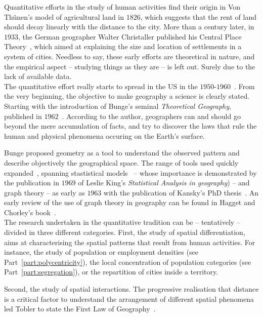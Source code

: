 Quantitative efforts in the study of human activities find their origin in Von
Th\"unen's model of agricultural land in $1826$, which suggests that the rent of land
should decay linearly with the distance to the city. More than a century later,
in $1933$, the German geographer Walter Christaller published his Central Place
Theory~\cite{Christaller:1933}, which aimed at explaining the size and location
of settlements in a system of cities. Needless to say, these early efforts are
theoretical in nature, and the empirical aspect -- studying things as they are
-- is left out. Surely due to the lack of available data.\\

The quantitative effort really starts to spread in the US in the
$1950$-$1960$~\cite{Berry:1993}. From the very beginning, the objective to make
geography a science is clearly stated. Starting with the introduction of Bunge's
seminal \emph{Theoretical Geography}, published in $1962$~\cite{Bunge:1962}.
According to the author, geographers can and should go beyond the mere
accumulation of facts, and try to discover the laws that rule the human and
physical phenomena occuring on the Earth's surface.   

Bunge proposed geometry as a tool to understand the observed pattern and
describe objectively the geographical space. The range of tools used quickly
expanded~\cite{Haggett:1966,Chorley:1968}, spanning stastistical
models~\cite{King:1969, Brunsdon:1998} -- whose importance is demonstrated by
the publication in $1969$ of Leslie King's \emph{Statistical Analysis in
geography}) -- and graph theory  -- as early as $1963$ with the publication of
Kansky's PhD thesis~\cite{Kansky:1963}. An early review of the use of graph
theory in geography can be found in Hagget and Chorley's
book~\cite{Haggett:1969}.\\

The research undertaken in the quantitative tradition can be -- tentatively --
divided in three different categories. First, the study of spatial
differentiation, aims at characterising the spatial patterns that result from
human activities. For instance, the study of population or employment densities
(see Part~\ref{part:polycentricity}), the local concentration of population
categories (see Part~\ref{part:segregation}), or the repartition of cities
inside a territory. 

Second, the study of spatial interactions. The progressive realisation that
distance is a critical factor to understand the arrangement of different spatial
phenomena led Tobler to state the First Law of Geography~\cite{Tobler:1970}. 

